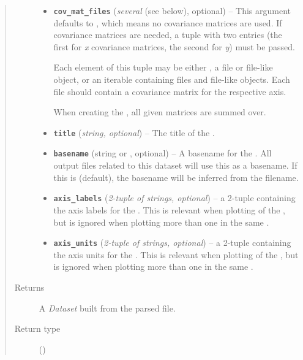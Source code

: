 \documentclass[a4paper,10pt,english]{sphinxmanual}
\begin{document}
\begin{fulllineitems}
\begin{quote}
\begin{description}
\begin{itemize}
\item {} 
\textbf{\texttt{cov\_mat\_files}} (\emph{several} (see below), optional) -- 
This argument defaults to , which means no covariance matrices
are used. If covariance matrices are needed, a tuple with two entries
(the first for \emph{x} covariance matrices, the second for \emph{y}) must be
passed.

Each element of this tuple may be either , a file or file-like
object, or an iterable containing files and file-like objects. Each
file should contain a covariance matrix for the respective axis.

When creating the , all given matrices are summed over.


\item {} 
\textbf{\texttt{title}} (\emph{string, optional}) -- The title of the .

\item {} 
\textbf{\texttt{basename}} (string or , optional) -- A basename for the . All output files related to this dataset
will use this as a basename. If this is  (default), the
basename will be inferred from the filename.

\item {} 
\textbf{\texttt{axis\_labels}} (\emph{2-tuple of strings, optional}) -- a 2-tuple containing the axis labels for the . This is
relevant when plotting  of the , but is ignored when
plotting more than one  in the same .

\item {} 
\textbf{\texttt{axis\_units}} (\emph{2-tuple of strings, optional}) -- a 2-tuple containing the axis units for the . This is
relevant when plotting  of the , but is ignored when
plotting more than one  in the same .

\end{itemize}

\item[{Returns}] \leavevmode
A \emph{Dataset} built from the parsed file.

\item[{Return type}] \leavevmode
{\hyperref[module_doc:kafe.dataset.Dataset]{\emph{}}} ()

\end{description}\end{quote}

\end{fulllineitems}
\end{document}
